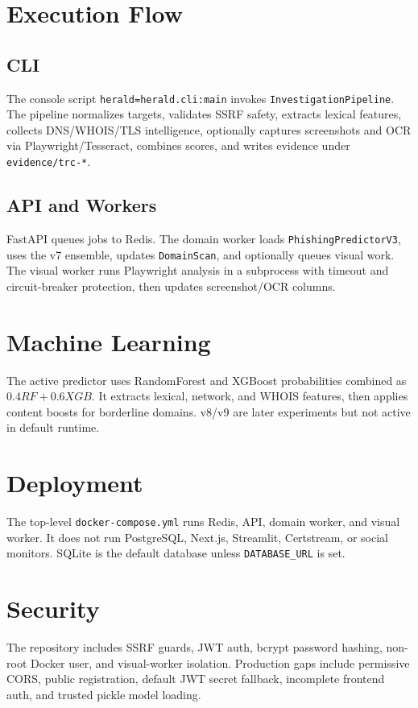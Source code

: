 \documentclass[11pt]{article}
\begin{document}
\section{Execution Flow}
\subsection{CLI}
The console script \texttt{herald=herald.cli:main} invokes \texttt{InvestigationPipeline}. The pipeline normalizes targets, validates SSRF safety, extracts lexical features, collects DNS/WHOIS/TLS intelligence, optionally captures screenshots and OCR via Playwright/Tesseract, combines scores, and writes evidence under \texttt{evidence/trc-*}.

\subsection{API and Workers}
FastAPI queues jobs to Redis. The domain worker loads \texttt{PhishingPredictorV3}, uses the v7 ensemble, updates \texttt{DomainScan}, and optionally queues visual work. The visual worker runs Playwright analysis in a subprocess with timeout and circuit-breaker protection, then updates screenshot/OCR columns.

\section{Machine Learning}
The active predictor uses RandomForest and XGBoost probabilities combined as $0.4 RF + 0.6 XGB$. It extracts lexical, network, and WHOIS features, then applies content boosts for borderline domains. v8/v9 are later experiments but not active in default runtime.

\section{Deployment}
The top-level \texttt{docker-compose.yml} runs Redis, API, domain worker, and visual worker. It does not run PostgreSQL, Next.js, Streamlit, Certstream, or social monitors. SQLite is the default database unless \texttt{DATABASE\_URL} is set.

\section{Security}
The repository includes SSRF guards, JWT auth, bcrypt password hashing, non-root Docker user, and visual-worker isolation. Production gaps include permissive CORS, public registration, default JWT secret fallback, incomplete frontend auth, and trusted pickle model loading.
\end{document}
